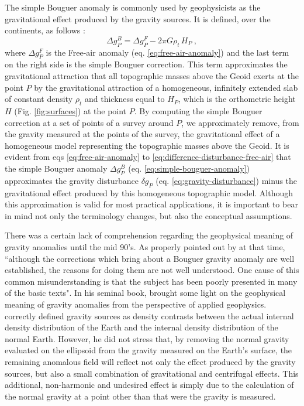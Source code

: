 \documentclass[extra]{gji}
\begin{document}
The simple Bouguer anomaly is commonly used by geophysicists as the
gravitational effect produced by the gravity sources.
It is defined, over the continents, as follows 
\citep{blakely1996, hofmann-wellenhof-moritz2005}:
\begin{equation}
\Delta g_{P}^{B} 
= \Delta g_{P}^{F} - 2 \pi G \rho_{t} \, H_{P} \: ,
\label{eq:simple-bouguer-anomaly}
\end{equation}
where $\Delta g_{P}^{F}$ is the Free-air anomaly (eq. \ref{eq:free-air-anomaly})
and the last term on the right side is the simple Bouguer correction.
This term approximates the gravitational attraction that all topographic 
masses above the Geoid exerts at the point $P$ by the gravitational 
attraction of a homogeneous, infinitely extended slab of 
constant density $\rho_{t}$ and thickness equal to $H_{P}$, which is 
the orthometric height $H$ (Fig. \ref{fig:surfaces}) at the point $P$.
By computing the simple Bouguer correction at a set of points
of a survey around $P$, we approximately remove, 
from the gravity measured at the points of the survey,
the gravitational effect of a homogeneous model representing 
the topographic masses above the Geoid.
It is evident from eqs 
\ref{eq:free-air-anomaly} to \ref{eq:difference-disturbance-free-air} 
that the simple Bouguer anomaly $\Delta g_{P}^{B}$ (eq.
\ref{eq:simple-bouguer-anomaly}) approximates the gravity disturbance
$\delta g_{P}$ (eq. \ref{eq:gravity-disturbance})
minus the gravitational effect produced by this homogeneous topographic
model.
Although this approximation is valid for most practical applications,
it is important to bear in mind not only the terminology 
changes, but also the conceptual assumptions.

There was a certain lack of comprehension regarding the
geophysical meaning of gravity anomalies until the
mid 90's.
As properly pointed out by \citet{chapin1996} at that time, 
``although the corrections which bring about a Bouguer 
gravity anomaly are well established, the reasons for doing
them are not well understood. One cause of this common 
misunderstanding is that the subject has been poorly presented in
many of the basic texts".
In his seminal book, \citet{blakely1996} brought some light
on the geophysical meaning of gravity anomalies from the 
perspective of applied geophysics. \citet{blakely1996} correctly
defined gravity sources as density contrasts between the actual
internal density distribution of the Earth and the internal density
distribution of the normal Earth.
However, he did not stress that, by removing the normal gravity 
evaluated on the ellipsoid from the gravity measured 
on the Earth's surface, the remaining anomalous field will reflect 
not only the effect produced by the gravity sources, but also a
small combination of gravitational and centrifugal effects.
This additional, non-harmonic and undesired effect is 
simply due to the calculation of the normal gravity at a point
other than that were the gravity is measured.
\end{document}
